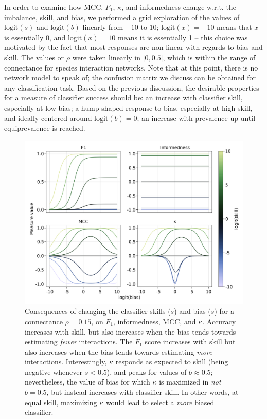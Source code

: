 \documentclass[11pt]{article}
\makeatletter
\def\maxwidth{\ifdim\Gin@nat@width>\linewidth\linewidth
\else\Gin@nat@width\fi}
\let\Oldincludegraphics\includegraphics
\renewcommand{\includegraphics}[1]{\Oldincludegraphics[width=\maxwidth]{#1}}
\makeatother
\begin{document}
In order to examine how MCC, \(F_1\), \(\kappa\), and informedness
change w.r.t. the imbalance, skill, and bias, we performed a grid
exploration of the values of \(\text{logit}(s)\) and \(\text{logit}(b)\)
linearly from \(-10\) to \(10\); \(\text{logit}(x) = -10\) means that
\(x\) is essentially 0, and \(\text{logit}(x) = 10\) means it is
essentially 1 -- this choice was motivated by the fact that most
responses are non-linear with regards to bias and skill. The values or
\(\rho\) were taken linearly in \(]0, 0.5]\), which is within the range
of connectance for species interaction networks. Note that at this
point, there is no network model to speak of; the confusion matrix we
discuss can be obtained for any classification task. Based on the
previous discussion, the desirable properties for a measure of
classifier success should be: an increase with classifier skill,
especially at low bias; a hump-shaped response to bias, especially at
high skill, and ideally centered around \(\text{logit}(b)=0\); an
increase with prevalence up until equiprevalence is reached.

\begin{figure}
\hypertarget{fig:bias}{%
\centering
\includegraphics{figures/changing-bias.png}
\caption{Consequences of changing the classifier skills (\(s\)) and bias
(\(s\)) for a connectance \(\rho=0.15\), on \(F_1\), informedness, MCC,
and \(\kappa\). Accuracy increases with skill, but also increases when
the bias tends towards estimating \emph{fewer} interactions. The \(F_1\)
score increases with skill but also increases when the bias tends
towards estimating \emph{more} interactions. Interestingly, \(\kappa\)
responds as expected to skill (being negative whenever \(s < 0.5\)), and
peaks for values of \(b \approx 0.5\); nevertheless, the value of bias
for which \(\kappa\) is maximized in \emph{not} \(b=0.5\), but instead
increases with classifier skill. In other words, at equal skill,
maximizing \(\kappa\) would lead to select a \emph{more} biased
classifier.}\label{fig:bias}
}
\end{figure}
\end{document}
